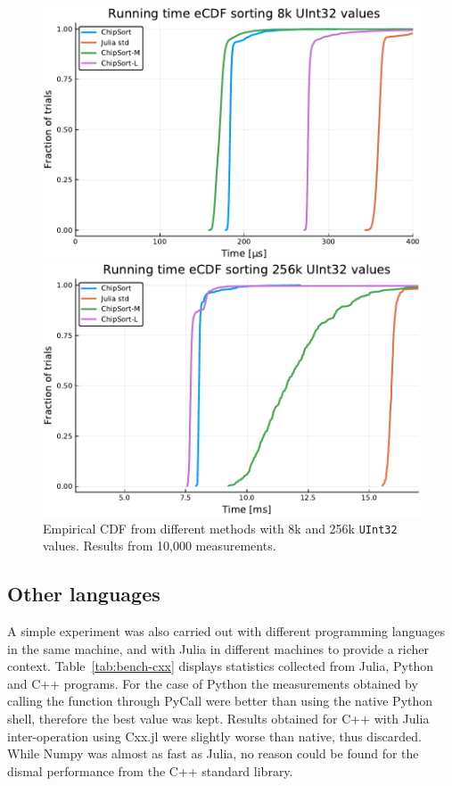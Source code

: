 \documentclass{juliacon}
\begin{document}
\begin{figure}[htb]
\centerline{\includegraphics[width=0.9\linewidth]{fig/chipsort-bench-8k.pdf}}
\centerline{\includegraphics[width=0.9\linewidth]{fig/chipsort-bench-256k.pdf}}
\caption{Empirical CDF from different methods with 8k and 256k {\tt UInt32} values. Results from 10,000 measurements.}
\label{fig:bench-cdf}
\end{figure}

\subsection{Other languages}
A simple experiment was also carried out with different programming languages in the same machine, and with Julia in different machines to provide a richer context. Table~\ref{tab:bench-cxx} displays statistics collected from Julia, Python and C++ programs. For the case of Python the measurements obtained by calling the function through PyCall were better than using the native Python shell, therefore the best value was kept. Results obtained for C++ with Julia inter-operation using Cxx.jl were slightly worse than native, thus discarded. While Numpy was almost as fast as Julia, no reason could be found for the dismal performance from the C++ standard library.
\end{document}
